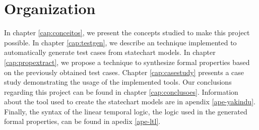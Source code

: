 \section{Organization}

In chapter \ref{cap:conceitos}, we present the concepts studied to make this project possible. In chapter \ref{cap:testgen}, we describe an technique implemented to automatically generate test cases from statechart models. In chapter \ref{cap:propextract}, we propose a technique to synthesize formal properties based on the previously obtained test cases. Chapter \ref{cap:casestudy} presents a case study demonstrating the usage of the implemented tools. Our conclusions regarding this project can be found in chapter \ref{cap:conclusoes}. Information about the tool used to create the statechart models are in apendix \ref{ape-yakindu}. Finally, the syntax of the linear temporal logic, the logic used in the generated formal properties, can be found in apedix \ref{ape-ltl}.
